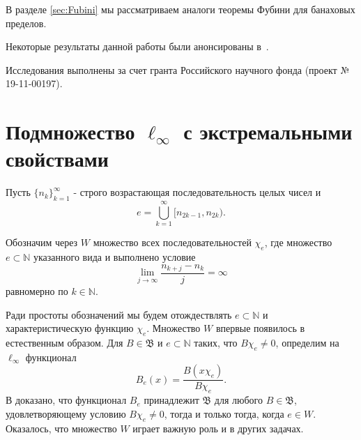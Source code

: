 \documentclass[12pt]{article}
\def\N{{\mathbb{N}}}
\def\B{{\mathfrak{B}}}
\begin{document}
В разделе \ref{sec:Fubini} мы рассматриваем аналоги теоремы Фубини для банаховых пределов.


Некоторые результаты данной работы были анонсированы в~\cite{AvSU}.

Исследования выполнены за счет гранта Российского научного
фонда (проект № 19-11-00197).






\section{Подмножество $\ell_\infty$ с экстремальными свойствами}\label{sec:W}

Пусть $\{n_k\}_{k=1}^\infty$ - строго возрастающая  последовательность целых чисел и
\begin{equation}\label{e}
e =\bigcup\limits_{k=1}^\infty[n_{2k-1},n_{2k}).
\end{equation}

Обозначим через $W$ множество всех последовательностей $\chi_e$, где множество  $e \subset \N$ указанного вида
и выполнено условие
\begin{equation}\label{growth_cond}
    \lim\limits_{j\to\infty}\frac{n_{k+j}-n_k}j=\infty
\end{equation}
равномерно по $k\in \mathbb N$.

Ради простоты обозначений мы будем отождествлять $e \subset \N$ и характеристическую функцию $\chi_e$. Множество $W$ впервые появилось в~\cite[\S 5]{SSU2} естественным образом. Для $B\in \B$ и $e\subset \N$ таких, что $B\chi_e\neq 0$, определим на $\ell_\infty$ функционал
$$B_e(x)=\frac{B(x\chi_e)}{B\chi_e}.$$
В \cite[Т. 25]{SSU2} доказано, что функционал $B_e$ принадлежит $\B$ для любого $B\in \B$, удовлетворяющему условию $B\chi_e\neq 0$, тогда и только тогда, когда $e\in W$. Оказалось, что множество $W$ играет важную роль и в других задачах.


\end{document}

